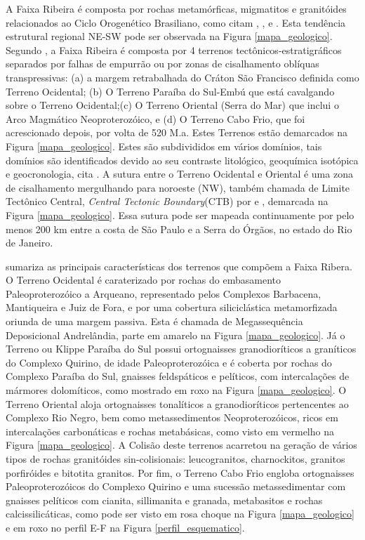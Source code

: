 A Faixa Ribeira é composta por rochas metamórficas, migmatitos e granitóides relacionados ao Ciclo Orogenético Brasiliano, como citam \cite{kuhn_metamorphic_2004}, \cite{heilbron_evolution_2010}, \cite{valeriano_u_pb_2011} e \cite{heilbron_serra_2013}. Esta tendência estrutural regional NE-SW pode ser observada na Figura \ref{mapa_geologico}. Segundo \cite{heilbron_evolution_2010}, a Faixa Ribeira é composta por 4 terrenos tectônicos-estratigráficos separados por falhas de empurrão ou por zonas de cisalhamento oblíquas transpressivas: (a) a margem retrabalhada do Cráton São Francisco definida como Terreno Ocidental; (b) O Terreno Paraíba do Sul-Embú que está cavalgando sobre o Terreno Ocidental;(c) O Terreno Oriental (Serra do Mar) que inclui o Arco Magmático Neoproterozóico, e (d) O Terreno Cabo Frio, que foi acrescionado depois, por volta de 520 M.a. Estes Terrenos estão demarcados na Figura \ref{mapa_geologico}. Estes são subdivididos em vários domínios, tais domínios são identificados devido ao seu contraste litológico, geoquímica isotópica e geocronologia, cita \cite{kuhn_metamorphic_2004}. A sutura entre o Terreno Ocidental e Oriental é uma zona de cisalhamento mergulhando para noroeste (NW), também chamada de Limite Tectônico Central, \textit{Central Tectonic Boundary}(CTB) por \cite{heilbron_evolution_2010} e \cite{trouw_new_2013}, demarcada na Figura \ref{mapa_geologico}. Essa sutura pode ser mapeada continuamente por pelo menos 200 km entre a costa de São Paulo e a Serra do Órgãos, no estado do Rio de Janeiro. 

\cite{trouw_new_2013} sumariza as principais características dos terrenos que compõem a Faixa Ribera. O Terreno Ocidental é caraterizado por rochas do embasamento Paleoproterozóico a Arqueano, representado pelos Complexos Barbacena, Mantiqueira e Juiz de Fora, e por uma cobertura siliciclástica metamorfizada oriunda de uma margem passiva. Esta é chamada de Megassequência Deposicional Andrelândia, parte em amarelo na Figura \ref{mapa_geologico}. Já o Terreno ou Klippe Paraíba do Sul possui ortognaisses granodioríticos a graníticos do Complexo Quirino, de idade Paleoproterozóica e é coberta por rochas do Complexo Paraíba do Sul, gnaisses feldspáticos e pelíticos, com intercalações de mármores dolomíticos, como mostrado em roxo na Figura \ref{mapa_geologico}. O Terreno Oriental aloja ortognaisses tonalíticos a granodioríticos pertencentes ao Complexo Rio Negro, bem como metassedimentos Neoproterozóicos, ricos em intercalações carbonáticas e rochas metabásicas, como visto em vermelho na Figura \ref{mapa_geologico}. A Colisão deste terrenos acarretou na geração de vários tipos de rochas granitóides sin-colisionais: leucogranitos, charnockitos, granitos porfiróides e bitotita granitos. Por fim, o Terreno Cabo Frio engloba ortognaisses Paleoproterozóicos do Complexo Quirino e uma sucessão metassedimentar com gnaisses pelíticos com cianita, sillimanita e granada, metabasitos e rochas calcissilicáticas, como pode ser visto em rosa choque na Figura \ref{mapa_geologico} e em roxo no perfil E-F na Figura \ref{perfil_esquematico}. 

